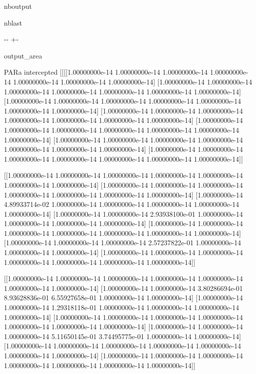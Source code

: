 \documentclass[letterpaper,10pt,english]{sphinxmanual}
\begin{document}
\begin{sphinxuseclass}{nboutput}
\begin{sphinxuseclass}{nblast}
{

\kern-\sphinxverbatimsmallskipamount\kern-\baselineskip
\kern+\FrameHeightAdjust\kern-\fboxrule
\vspace{\nbsphinxcodecellspacing}

\begin{sphinxuseclass}{output_area}
\begin{sphinxuseclass}{}


\begin{sphinxVerbatim}[commandchars=\\\{\}]
PARa intercepted
[[[[1.00000000e-14 1.00000000e-14 1.00000000e-14 1.00000000e-14
    1.00000000e-14 1.00000000e-14 1.00000000e-14]
   [1.00000000e-14 1.00000000e-14 1.00000000e-14 1.00000000e-14
    1.00000000e-14 1.00000000e-14 1.00000000e-14]
   [1.00000000e-14 1.00000000e-14 1.00000000e-14 1.00000000e-14
    1.00000000e-14 1.00000000e-14 1.00000000e-14]
   [1.00000000e-14 1.00000000e-14 1.00000000e-14 1.00000000e-14
    1.00000000e-14 1.00000000e-14 1.00000000e-14]
   [1.00000000e-14 1.00000000e-14 1.00000000e-14 1.00000000e-14
    1.00000000e-14 1.00000000e-14 1.00000000e-14]
   [1.00000000e-14 1.00000000e-14 1.00000000e-14 1.00000000e-14
    1.00000000e-14 1.00000000e-14 1.00000000e-14]
   [1.00000000e-14 1.00000000e-14 1.00000000e-14 1.00000000e-14
    1.00000000e-14 1.00000000e-14 1.00000000e-14]]

  [[1.00000000e-14 1.00000000e-14 1.00000000e-14 1.00000000e-14
    1.00000000e-14 1.00000000e-14 1.00000000e-14]
   [1.00000000e-14 1.00000000e-14 1.00000000e-14 1.00000000e-14
    1.00000000e-14 1.00000000e-14 1.00000000e-14]
   [1.00000000e-14 4.89933714e-02 1.00000000e-14 1.00000000e-14
    1.00000000e-14 1.00000000e-14 1.00000000e-14]
   [1.00000000e-14 1.00000000e-14 2.93938100e-01 1.00000000e-14
    1.00000000e-14 1.00000000e-14 1.00000000e-14]
   [1.00000000e-14 1.00000000e-14 1.00000000e-14 1.00000000e-14
    1.00000000e-14 1.00000000e-14 1.00000000e-14]
   [1.00000000e-14 1.00000000e-14 1.00000000e-14 2.57237822e-01
    1.00000000e-14 1.00000000e-14 1.00000000e-14]
   [1.00000000e-14 1.00000000e-14 1.00000000e-14 1.00000000e-14
    1.00000000e-14 1.00000000e-14 1.00000000e-14]]

  [[1.00000000e-14 1.00000000e-14 1.00000000e-14 1.00000000e-14
    1.00000000e-14 1.00000000e-14 1.00000000e-14]
   [1.00000000e-14 1.00000000e-14 3.80286694e-01 8.93628836e-01
    6.55927658e-01 1.00000000e-14 1.00000000e-14]
   [1.00000000e-14 1.00000000e-14 1.29318118e-01 1.00000000e-14
    1.00000000e-14 1.00000000e-14 1.00000000e-14]
   [1.00000000e-14 1.00000000e-14 1.00000000e-14 1.00000000e-14
    1.00000000e-14 1.00000000e-14 1.00000000e-14]
   [1.00000000e-14 1.00000000e-14 1.00000000e-14 5.11650145e-01
    3.74495775e-01 1.00000000e-14 1.00000000e-14]
   [1.00000000e-14 1.00000000e-14 1.00000000e-14 1.00000000e-14
    1.00000000e-14 1.00000000e-14 1.00000000e-14]
   [1.00000000e-14 1.00000000e-14 1.00000000e-14 1.00000000e-14
    1.00000000e-14 1.00000000e-14 1.00000000e-14]]


\end{sphinxVerbatim}
\end{sphinxuseclass}
\end{sphinxuseclass}}
\end{sphinxuseclass}
\end{sphinxuseclass}
\end{document}
